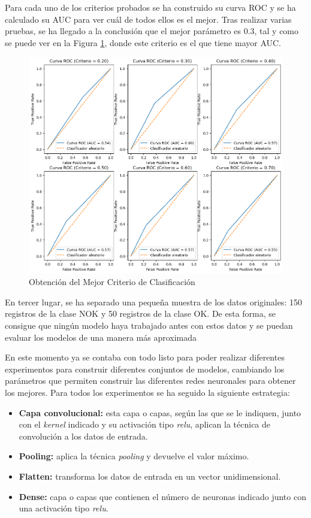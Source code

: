 Para cada uno de los criterios probados se ha construido su curva ROC y se ha calculado su AUC para ver cuál de todos ellos es el mejor. Tras realizar varias pruebas, se ha llegado a la conclusión que el mejor parámetro es 0.3, tal y como se puede ver en la Figura \ref{f:curvasROC}, donde este criterio es el que tiene mayor AUC.

\begin{figure}[h]
 \centering
  \includegraphics[width=1\textwidth]{img/curvasROC.PNG}
 \caption{Obtención del Mejor Criterio de Clasificación}
 \label{f:curvasROC}
\end{figure}

En tercer lugar, se ha separado una pequeña muestra de los datos originales: 150 registros de la clase NOK y 50 registros de la clase OK. De esta forma, se consigue que ningún modelo haya trabajado antes con estos datos y se puedan evaluar los modelos de una manera más aproximada

En este momento ya se contaba con todo listo para poder realizar diferentes experimentos para construir diferentes conjuntos de modelos, cambiando los parámetros que permiten construir las diferentes redes neuronales para obtener los mejores. Para todos los experimentos se ha seguido la siguiente estrategia:

\begin{itemize}
    \item \textbf{Capa convolucional:} esta capa o capas, según las que se le indiquen, junto con el \emph{kernel} indicado y su activación tipo \emph{relu}, aplican la técnica de convolución a los datos de entrada.
    \item \textbf{Pooling:} aplica la técnica \emph{pooling} y devuelve el valor máximo.
    \item \textbf{Flatten:} transforma los datos de entrada en un vector unidimensional.
    \item \textbf{Dense:} capa o capas que contienen el número de neuronas indicado junto con una activación tipo \emph{relu}.
\end{itemize}

